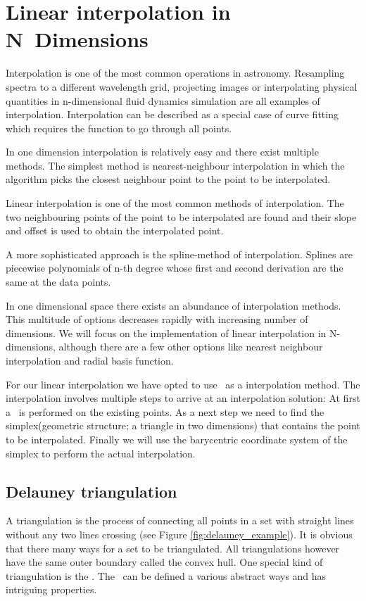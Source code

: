 \chapter{Linear interpolation in N~Dimensions}
\label{chap:ndinterpolation}

Interpolation is one of the most common operations in astronomy. Resampling spectra to a different wavelength grid, projecting images or interpolating physical quantities in n-dimensional fluid dynamics simulation are all examples of interpolation.
Interpolation can be described as a special case of curve fitting which requires the function to go through all points. 

In one dimension interpolation is relatively easy and there exist multiple methods. The simplest method is nearest-neighbour interpolation in which the algorithm picks the closest neighbour point to the point to be interpolated. 

Linear interpolation is one of the most common methods of interpolation. The two neighbouring points of the point to be interpolated are found and their slope and offset is used to obtain the interpolated point.

A more sophisticated approach is the spline-method of interpolation. Splines are piecewise polynomials of n-th degree whose first and second derivation are the same at the data points.

In one dimensional space there exists an abundance of interpolation methods. This multitude of options decreases rapidly with increasing number of dimensions. 
We will focus on the implementation of linear interpolation in N-dimensions, although there are a few other options like nearest neighbour interpolation and radial basis function.

For our linear interpolation we have opted to use \deltri\ as a interpolation method. The interpolation involves multiple steps to arrive at an interpolation solution: At first a \deltri\ is performed on the existing points. As a next step we need to find the simplex(geometric structure; a triangle in two dimensions) that contains the point to be interpolated. 
Finally we will use the barycentric coordinate system of the simplex to perform the actual interpolation.






\section{Delauney triangulation}
\label{sec:delauney_tri}
A triangulation is the process of connecting all points in a set with straight lines without any two lines crossing (see Figure \ref{fig:delauney_example}). It is obvious that there many ways for a set to be triangulated. All triangulations however have the same outer boundary called the convex hull. One special kind of triangulation is the \deltri. The \deltri\ can be defined a various abstract ways and has intriguing properties.

